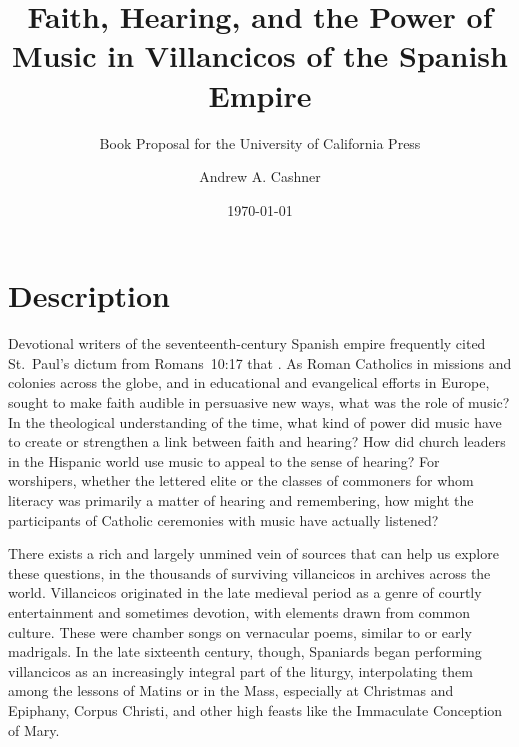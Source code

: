 \documentclass[tt]{vcbook-proposal}
\newcommand{\publisher}{the University of California Press}
\begin{document}
\frontmatter

\begin{titlingpage}
\title    {Faith, Hearing, and the Power of Music 
           in Villancicos of the Spanish Empire}
\subtitle {Book Proposal for \publisher}
\author   {Andrew A. Cashner}
\date     {\today}
\maketitle
\end{titlingpage}

\tableofcontents*

\mainmatter

\section{Description}

Devotional writers of the seventeenth-century Spanish empire frequently cited St.~Paul's dictum from Romans~10:17 that .
As Roman Catholics in missions and colonies across the globe, and in educational and evangelical efforts in Europe, sought to make faith audible in persuasive new ways, what was the role of music?
In the theological understanding of the time, what kind of power did music have to create or strengthen a link between faith and hearing?
How did church leaders in the Hispanic world use music to appeal to the sense of hearing?
For worshipers, whether the lettered elite or the classes of commoners for whom literacy was primarily a matter of hearing and remembering, how might the participants of Catholic ceremonies with music have actually listened?

There exists a rich and largely unmined vein of sources that can help us explore these questions, in the thousands of surviving villancicos in archives across the world.
Villancicos originated in the late medieval period as a genre of courtly entertainment and sometimes devotion, with elements drawn from common culture.
These were chamber songs on vernacular poems, similar to  or early madrigals.
In the late sixteenth century, though, Spaniards began performing villancicos as an increasingly integral part of the liturgy, interpolating them among the lessons of Matins or in the Mass, especially at Christmas and Epiphany, Corpus Christi, and other high feasts like the Immaculate Conception of Mary.
\end{document}
